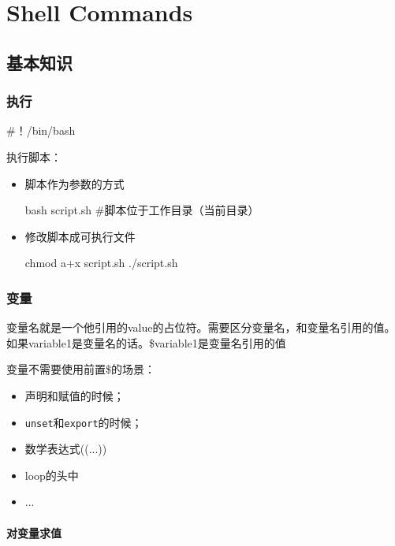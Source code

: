 \chapter{Shell Commands}

\section{基本知识}

\subsection{执行}

\begin{Command-Line}[开头告诉shell使用什么bash]
#！/bin/bash
\end{Command-Line}


执行脚本：

\begin{itemize}
\item 脚本作为参数的方式
\begin{Command-Line}
bash script.sh   #脚本位于工作目录（当前目录）
\end{Command-Line}

\item 修改脚本成可执行文件

\begin{Command-Line}[内核会读取首行来确定执行的bash]
chmod a+x script.sh
./script.sh
\end{Command-Line}

\end{itemize}

\subsection{变量}

变量名就是一个他引用的value的占位符。需要区分变量名，和变量名引用的值。如果variable1是变量名的话。\$variable1是变量名引用的值

变量不需要使用前置\$的场景：
\begin{itemize}
\item 声明和赋值的时候；
\item \lstinline$unset$和\lstinline$export$的时候；
\item 数学表达式((...))
\item loop的头中
\item ...
\end{itemize}


\subsubsection{对变量求值}



